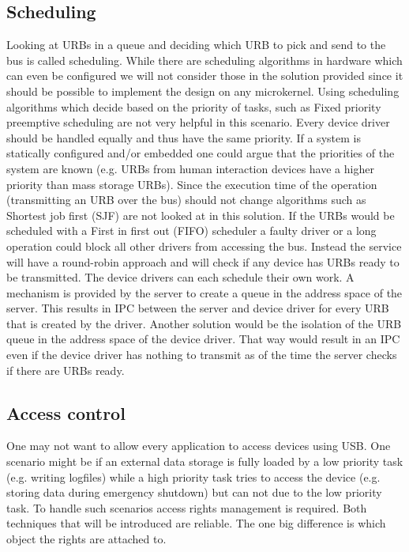 \documentclass{acm_proc_article-sp}
\begin{document}
\subsection{Scheduling}
Looking at URBs in a queue and deciding which URB to pick and send to the bus is called
scheduling.
While there are scheduling algorithms in hardware which can even be configured \cite{chs-ERSA03}
we will not consider those in the solution provided since it should be possible to implement
the design on any microkernel.
Using scheduling algorithms which decide based on the priority of tasks, such as Fixed priority
preemptive scheduling are not very helpful in this scenario.
Every device driver should be handled equally and thus have the same priority.
If a system is statically configured and/or embedded one could argue that the priorities of
the system are known (e.g. URBs from human interaction devices have a higher priority than
mass storage URBs).
Since the execution time of the operation (transmitting an URB over the bus) should not change
algorithms such as Shortest job first (SJF) are not looked at in this solution.
If the URBs would be scheduled with a First in first out (FIFO) scheduler a faulty driver
or a long operation could block all other drivers from accessing the bus.
Instead the service will have a round-robin approach and will check if any device has URBs
ready to be transmitted.
The device drivers can each schedule their own work.
A mechanism is provided by the server to create a queue in the address space of the server.
This results in IPC between the server and device driver for every URB that is created by
the driver.
Another solution would be the isolation of the URB queue in the address space of the device
driver.
That way would result in an IPC even if the device driver has nothing to transmit as of the
time the server checks if there are URBs ready.

\subsection{Access control}
One may not want to allow every application to access devices using USB. One scenario might be if an external data storage is fully loaded by a low priority task (e.g. writing logfiles) while a high priority task tries to access the device (e.g. storing data during emergency shutdown) but can not due to the low priority task. To handle such scenarios access rights management is required.
Both techniques that will be introduced are reliable. The one big difference is which object the rights are attached to.
\end{document}
